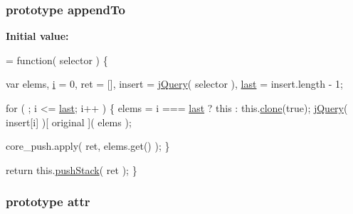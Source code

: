 \subsubsection[{append\+To}]{ {\bf prototype} append\+To}\label{jquery-1_810_82-vsdoc_8js_a74dc247b9c1e66b8cd2aad9037eeaca5}
{\bfseries Initial value\+:}
\begin{DoxyCode}
= \textcolor{keyword}{function}( selector ) \{


        var elems,
            \hyperlink{_bibabook_2_scripts_2respond_8min_8js_a5e25b1d1bed9ab5f3174b76d6a722180}{i} = 0,
            ret = [],
            insert = \hyperlink{jquery-1_810_82-vsdoc_8js_add5237586d970a38a81f990e8eb28c6c}{jQuery}( selector ),
            \hyperlink{jquery-1_810_82-vsdoc_8js_a5a9684d230de11a6ec3029bcce128977}{last} = insert.length - 1;

        \textcolor{keywordflow}{for} ( ; i <= \hyperlink{jquery-1_810_82-vsdoc_8js_a5a9684d230de11a6ec3029bcce128977}{last}; i++ ) \{
            elems = i === \hyperlink{jquery-1_810_82-vsdoc_8js_a5a9684d230de11a6ec3029bcce128977}{last} ? \textcolor{keyword}{this} : this.\hyperlink{jquery-1_810_82-vsdoc_8js_a7d74ce76585989b4b6e2d506577e13ad}{clone}(\textcolor{keyword}{true});
            \hyperlink{jquery-1_810_82-vsdoc_8js_add5237586d970a38a81f990e8eb28c6c}{jQuery}( insert[i] )[ original ]( elems );

            
            core\_push.apply( ret, elems.get() );
        \}

        \textcolor{keywordflow}{return} this.\hyperlink{jquery-1_810_82-vsdoc_8js_afc3a7db1ef2b526338c06c07cecccd44}{pushStack}( ret );
    \}
\end{DoxyCode}
\hypertarget{jquery-1_810_82-vsdoc_8js_aa76c97588b348e5c1975810431456d90}{}
\subsubsection[{attr}]{ {\bf prototype} attr}\label{jquery-1_810_82-vsdoc_8js_aa76c97588b348e5c1975810431456d90}
\hypertarget{jquery-1_810_82-vsdoc_8js_ad38ac586d2608526e63fb2b63fe11c6d}{}
